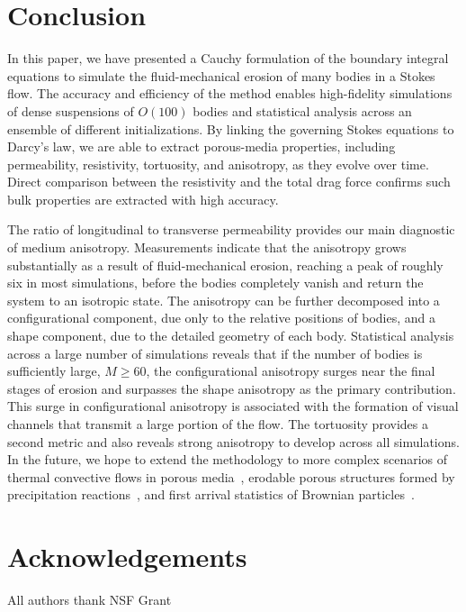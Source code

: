 \documentclass[3p]{elsarticle}
\begin{document}
\section{Conclusion}
\label{sec:conclusion}

In this paper, we have presented a Cauchy formulation of the boundary integral equations to simulate the fluid-mechanical erosion of many bodies in a Stokes flow. The accuracy and efficiency of the method enables high-fidelity simulations of dense suspensions of $O(100)$ bodies and statistical analysis across an ensemble of different initializations. By linking the governing Stokes equations to Darcy's law, we are able to extract porous-media properties, including permeability, resistivity, tortuosity, and anisotropy, as they evolve over time. Direct comparison between the resistivity and the total drag force confirms such bulk properties are extracted with high accuracy.

The ratio of longitudinal to transverse permeability provides our main diagnostic of medium anisotropy. Measurements indicate that the anisotropy grows substantially as a result of fluid-mechanical erosion, reaching a peak of roughly six in most simulations, before the bodies completely vanish and return the system to an isotropic state. The anisotropy can be further decomposed into a configurational component, due only to the relative positions of bodies, and a shape component, due to the detailed geometry of each body. Statistical analysis across a large number of simulations reveals that if the number of bodies is sufficiently large, $M \ge 60$, the configurational anisotropy surges near the final stages of erosion and surpasses the shape anisotropy as the primary contribution. This surge in configurational anisotropy is associated with the formation of visual channels that transmit a large portion of the flow. The tortuosity provides a second metric and also reveals strong anisotropy to develop across all simulations. In the future, we hope to extend the methodology to more complex scenarios of thermal convective flows in porous media~\cite{McCurdy2019}, erodable porous structures formed by precipitation reactions~\cite{eastham2020multiphase}, and first arrival statistics of Brownian particles~\cite{che-lin-her-qua2021}. 

\section*{Acknowledgements}
All authors thank NSF Grant



\end{document}
